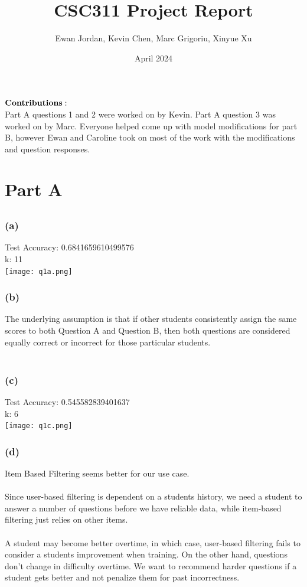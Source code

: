 \documentclass{article}
\title{CSC311 Project Report}
\author{Ewan Jordan, Kevin Chen, Marc Grigoriu, Xinyue Xu}
\date{April 2024}
\begin{document}
\maketitle
$\bold{Contributions:}$\\
Part A questions 1 and 2 were worked on by Kevin. Part A question 3 was worked on by Marc. Everyone helped come up with model modifications for part B, however Ewan and Caroline took on most of the work with the modifications and question responses.

\section{Part A}
\subsection{}
\subsubsection{(a)}
Test Accuracy: 0.6841659610499576\\
k: 11\\
\texttt{[image: q1a.png]}\\
\subsubsection{(b)}
The underlying assumption is that if other students consistently assign the same scores to both Question A and Question B, then both questions are considered equally correct or incorrect for those particular students.\\
\\
\subsubsection{(c)}
Test Accuracy: 0.545582839401637\\
k: 6\\
\texttt{[image: q1c.png]}\\
\newpage
\subsubsection{(d)}
Item Based Filtering seems better for our use case.\\
\\
Since user-based filtering is dependent on a students history, we need a student to answer a number of questions before we have reliable data, while item-based filtering just relies on other items.\\
\\
A student may become better overtime, in which case, user-based filtering fails to consider a students improvement when training. On the other hand, questions don't change in difficulty overtime. We want to recommend harder questions if a student gets better and not penalize them for past incorrectness.\\
\\
\end{document}
